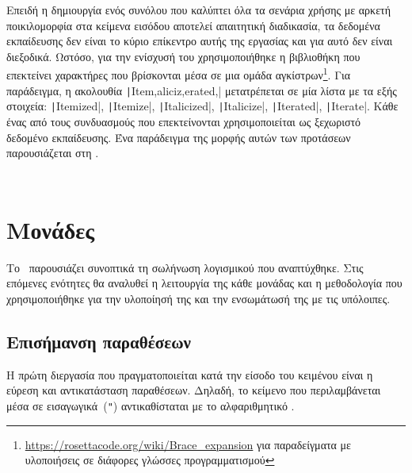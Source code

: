 Επειδή η δημιουργία ενός συνόλου που καλύπτει όλα τα σενάρια χρήσης με αρκετή ποικιλομορφία στα κείμενα εισόδου αποτελεί απαιτητική διαδικασία,
τα δεδομένα εκπαίδευσης δεν είναι το κύριο επίκεντρο αυτής της εργασίας και για αυτό δεν είναι διεξοδικά.
Ωστόσο, για την ενίσχυσή του χρησιμοποιήθηκε η βιβλιοθήκη  που επεκτείνει χαρακτήρες που βρίσκονται μέσα σε μια ομάδα αγκίστρων\footnote{\url{https://rosettacode.org/wiki/Brace_expansion} για παραδείγματα με υλοποιήσεις σε διάφορες γλώσσες προγραμματισμού}.
Για παράδειγμα, η ακολουθία \texttt|It{{em,alic}iz,erat}e{d,}| μετατρέπεται σε μία λίστα με τα εξής στοιχεία:
\texttt|Itemized|,
\texttt|Itemize|,
\texttt|Italicized|,
\texttt|Italicize|,
\texttt|Iterated|,
\texttt|Iterate|.
Κάθε ένας από τους συνδυασμούς που επεκτείνονται χρησιμοποιείται ως ξεχωριστό δεδομένο εκπαίδευσης.
Ένα παράδειγμα της μορφής αυτών των προτάσεων παρουσιάζεται στη .

\begin{listing}
    \inputminted{yaml}{../data/intent_ArmMotionOpen.yaml}
    \caption[Δήλωση της πρόθεσης \texttt{ArmMotionOpen}]{Δήλωση της πρόθεσης .
        Σημειώνεται ότι η  δεν αποτελεί ξεχωριστή ενέργεια του \metamodel{} αλλά είναι η  με .
        Αυτή η διάσπαση αναφέρεται στην .%
    }\label{lst:intent-yaml}
    \inputminted{text}{../data/utterances_ArmMotionOpen}
    \caption[Δεδομένα εκπαίδευσης για τη πρόθεση \texttt{ArmMotionOpen}]{Δεδομένα εκπαίδευσης για τη πρόθεση .
        Χρησιμοποιούνται διάφορα ρήματα που αντιστοιχούν σε αυτή την ενέργεια και, όπου είναι δυνατό, ομαδοποιούνται σε αγκύλες.%
    }\label{lst:utterances}
\end{listing}

\section{Μονάδες} %
Το~ παρουσιάζει συνοπτικά τη σωλήνωση λογισμικού που αναπτύχθηκε.
Στις επόμενες ενότητες θα αναλυθεί η λειτουργία της κάθε μονάδας και η μεθοδολογία που χρησιμοποιήθηκε για την υλοποίησή της και την ενσωμάτωσή της με τις υπόλοιπες.

\subsection{Επισήμανση παραθέσεων}\label{subsec:4-QuoteAnnotator}
\newcommand{\QUOTESTRING}{\engquote{\texttt{QUOTE}}}
Η πρώτη διεργασία που πραγματοποιείται κατά την είσοδο του κειμένου είναι η εύρεση και αντικατάσταση παραθέσεων.
Δηλαδή, το κείμενο που περιλαμβάνεται μέσα σε εισαγωγικά~(\texttt{"}) αντικαθίσταται με το αλφαριθμητικό \QUOTESTRING{}.

